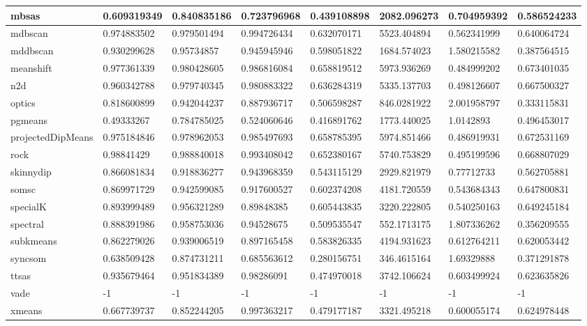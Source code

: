 \begin{table}[H]
\begin{tabular}{|l|l|l|l|l|l|l|l|}
\hline
mbsas & 0.609319349 & 0.840835186 & 0.723796968 & 0.439108898 & 2082.096273 & 0.704959392 & 0.586524233 \\
\hline
mdbscan & 0.974883502 & 0.979501494 & 0.994726434 & 0.632070171 & 5523.404894 & 0.562341999 & 0.640064724 \\
\hline
mddbscan & 0.930299628 & 0.95734857 & 0.945945946 & 0.598051822 & 1684.574023 & 1.580215582 & 0.387564515 \\
\hline
meanshift & 0.977361339 & 0.980428605 & 0.986816084 & 0.658819512 & 5973.936269 & 0.484999202 & 0.673401035 \\
\hline
n2d & 0.960342788 & 0.979740345 & 0.980883322 & 0.636284319 & 5335.137703 & 0.498126607 & 0.667500327 \\
\hline
optics & 0.818600899 & 0.942044237 & 0.887936717 & 0.506598287 & 846.0281922 & 2.001958797 & 0.333115831 \\
\hline
pgmeans & 0.49333267 & 0.784785025 & 0.524060646 & 0.416891762 & 1773.440025 & 1.0142893 & 0.496453017 \\
\hline
projectedDipMeans & 0.975184846 & 0.978962053 & 0.985497693 & 0.658785395 & 5974.851466 & 0.486919931 & 0.672531169 \\
\hline
rock & 0.98841429 & 0.988840018 & 0.993408042 & 0.652380167 & 5740.753829 & 0.495199596 & 0.668807029 \\
\hline
skinnydip & 0.866081834 & 0.918836277 & 0.943968359 & 0.543115129 & 2929.821979 & 0.77712733 & 0.562705881 \\
\hline
somsc & 0.869971729 & 0.942599085 & 0.917600527 & 0.602374208 & 4181.720559 & 0.543684343 & 0.647800831 \\
\hline
specialK & 0.893999489 & 0.956321289 & 0.89848385 & 0.605443835 & 3220.222805 & 0.540250163 & 0.649245184 \\
\hline
spectral & 0.888391986 & 0.958753036 & 0.94528675 & 0.509535547 & 552.1713175 & 1.807336262 & 0.356209555 \\
\hline
subkmeans & 0.862279026 & 0.939006519 & 0.897165458 & 0.583826335 & 4194.931623 & 0.612764211 & 0.620053442 \\
\hline
syncsom & 0.638509428 & 0.874731211 & 0.685563612 & 0.280156751 & 346.4615164 & 1.69329888 & 0.371291878 \\
\hline
ttsas & 0.935679464 & 0.951834389 & 0.98286091 & 0.474970018 & 3742.106624 & 0.603499924 & 0.623635826 \\
\hline
vade & -1 & -1 & -1 & -1 & -1 & -1 & -1 \\
\hline
xmeans & 0.667739737 & 0.852244205 & 0.997363217 & 0.479177187 & 3321.495218 & 0.600055174 & 0.624978448 \\
\hline
\end{tabular}
\end{table}